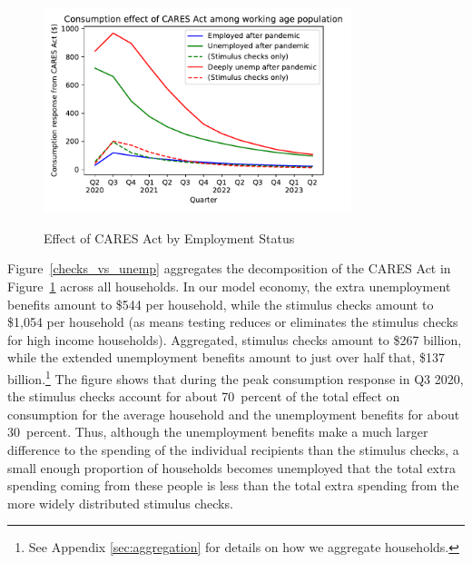 \documentclass[titlepage,a4paper]{\econtex}
\begin{document}
\begin{figure}
  \centering
  \caption{Effect of CARES Act by Employment Status}
  \label{stim_by_emp}
  { \includegraphics[width=0.8\textwidth]{./Figures/ConDeltaByEmpState}}
\end{figure}

Figure~\ref{checks_vs_unemp} aggregates the decomposition of the CARES Act in Figure~\ref{stim_by_emp} across all households.
In our model economy, the extra unemployment benefits amount to \$544 per household, while the stimulus checks amount to \$1,054 per household (as means testing reduces or eliminates the stimulus checks for high income households).
Aggregated, stimulus checks amount to \$267 billion, while the extended unemployment benefits amount to just over half that, \$137 billion.\footnote{See Appendix \ref{sec:aggregation} for details on how we aggregate households.}
The figure shows that during the peak consumption response in Q3 2020, the stimulus checks account for about 70~percent of the total effect on consumption for the average household and the unemployment benefits for about 30~percent.  Thus, although the unemployment benefits make a much larger difference to the spending of the individual recipients than the stimulus checks, a small enough proportion of households becomes unemployed that the total extra spending coming from these people is less than the total extra spending from the more widely distributed stimulus checks.
\end{document}
